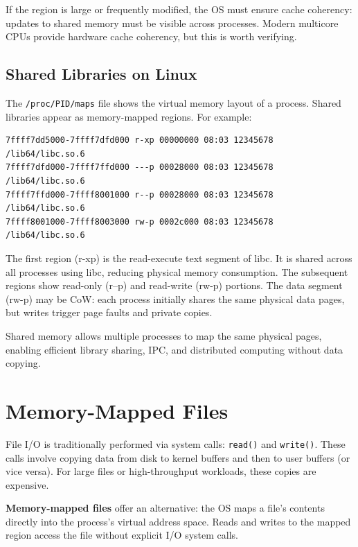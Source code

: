 \documentclass[11pt]{article}
\begin{document}
If the region is large or frequently modified, the OS must ensure cache coherency: updates to shared memory must be visible across processes. Modern multicore CPUs provide hardware cache coherency, but this is worth verifying.

\subsection{Shared Libraries on Linux}

The \texttt{/proc/PID/maps} file shows the virtual memory layout of a process. Shared libraries appear as memory-mapped regions. For example:

\begin{lstlisting}[caption={Example /proc/self/maps output showing shared libraries}]
7ffff7dd5000-7ffff7dfd000 r-xp 00000000 08:03 12345678 /lib64/libc.so.6
7ffff7dfd000-7ffff7ffd000 ---p 00028000 08:03 12345678 /lib64/libc.so.6
7ffff7ffd000-7ffff8001000 r--p 00028000 08:03 12345678 /lib64/libc.so.6
7ffff8001000-7ffff8003000 rw-p 0002c000 08:03 12345678 /lib64/libc.so.6
\end{lstlisting}

The first region (r-xp) is the read-execute text segment of libc. It is shared across all processes using libc, reducing physical memory consumption. The subsequent regions show read-only (r--p) and read-write (rw-p) portions. The data segment (rw-p) may be CoW: each process initially shares the same physical data pages, but writes trigger page faults and private copies.

\begin{keyidea}
Shared memory allows multiple processes to map the same physical pages, enabling efficient library sharing, IPC, and distributed computing without data copying.
\end{keyidea}

\section{Memory-Mapped Files}

File I/O is traditionally performed via system calls: \texttt{read()} and \texttt{write()}. These calls involve copying data from disk to kernel buffers and then to user buffers (or vice versa). For large files or high-throughput workloads, these copies are expensive.

\textbf{Memory-mapped files} offer an alternative: the OS maps a file's contents directly into the process's virtual address space. Reads and writes to the mapped region access the file without explicit I/O system calls.
\end{document}
